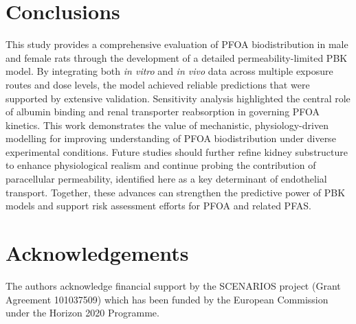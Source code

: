 \documentclass[preprint,12pt,authoryear]{elsarticle}
\begin{document}
\section{Conclusions}
This study provides a comprehensive evaluation of PFOA biodistribution in male and female rats through the development of a detailed permeability-limited PBK model. By integrating both \textit{in vitro} and \textit{in vivo} data across multiple exposure routes and dose levels, the model achieved reliable predictions that were supported by extensive validation. Sensitivity analysis highlighted the central role of albumin binding and renal transporter reabsorption in governing PFOA kinetics. This work demonstrates the value of mechanistic, physiology-driven modelling for improving understanding of PFOA biodistribution under diverse experimental conditions. Future studies should further refine kidney substructure to enhance physiological realism and continue probing the contribution of paracellular permeability, identified here as a key determinant of endothelial transport. Together, these advances can strengthen the predictive power of PBK models and support risk assessment efforts for PFOA and related PFAS.

\section*{Acknowledgements}
The authors acknowledge financial support by the SCENARIOS project
(Grant Agreement 101037509) which has
been funded by the European Commission under the Horizon
2020 Programme. 



\newpage

  

\end{document}
